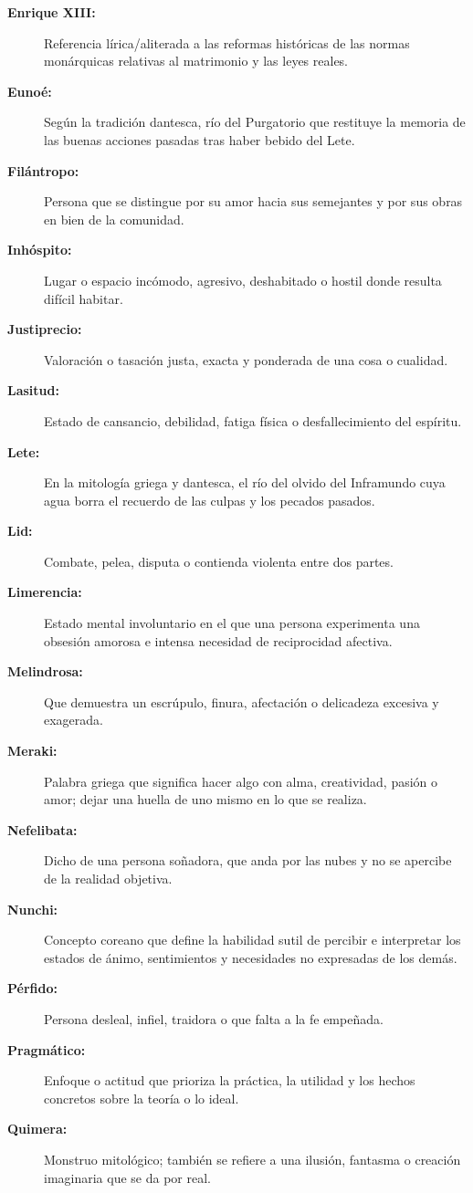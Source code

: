 \documentclass[12pt,oneside,a5paper]{book}
\begin{document}
\begin{description}
    \item[\textbf{Enrique XIII:}] Referencia lírica/aliterada a las reformas históricas de las normas monárquicas relativas al matrimonio y las leyes reales.
    \item[\textbf{Eunoé:}] Según la tradición dantesca, río del Purgatorio que restituye la memoria de las buenas acciones pasadas tras haber bebido del Lete.
    \item[\textbf{Filántropo:}] Persona que se distingue por su amor hacia sus semejantes y por sus obras en bien de la comunidad.
    \item[\textbf{Inhóspito:}] Lugar o espacio incómodo, agresivo, deshabitado o hostil donde resulta difícil habitar.
    \item[\textbf{Justiprecio:}] Valoración o tasación justa, exacta y ponderada de una cosa o cualidad.
    \item[\textbf{Lasitud:}] Estado de cansancio, debilidad, fatiga física o desfallecimiento del espíritu.
    \item[\textbf{Lete:}] En la mitología griega y dantesca, el río del olvido del Inframundo cuya agua borra el recuerdo de las culpas y los pecados pasados.
    \item[\textbf{Lid:}] Combate, pelea, disputa o contienda violenta entre dos partes.
    \item[\textbf{Limerencia:}] Estado mental involuntario en el que una persona experimenta una obsesión amorosa e intensa necesidad de reciprocidad afectiva.
    \item[\textbf{Melindrosa:}] Que demuestra un escrúpulo, finura, afectación o delicadeza excesiva y exagerada.
    \item[\textbf{Meraki:}] Palabra griega que significa hacer algo con alma, creatividad, pasión o amor; dejar una huella de uno mismo en lo que se realiza.
    \item[\textbf{Nefelibata:}] Dicho de una persona soñadora, que anda por las nubes y no se apercibe de la realidad objetiva.
    \item[\textbf{Nunchi:}] Concepto coreano que define la habilidad sutil de percibir e interpretar los estados de ánimo, sentimientos y necesidades no expresadas de los demás.
    \item[\textbf{Pérfido:}] Persona desleal, infiel, traidora o que falta a la fe empeñada.
    \item[\textbf{Pragmático:}] Enfoque o actitud que prioriza la práctica, la utilidad y los hechos concretos sobre la teoría o lo ideal.
    \item[\textbf{Quimera:}] Monstruo mitológico; también se refiere a una ilusión, fantasma o creación imaginaria que se da por real.

\end{description}
\end{document}
